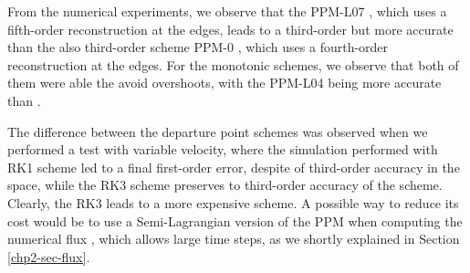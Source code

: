 From the numerical experiments, we observe that the PPM-L07 \citep{putman:2007},
which uses a fifth-order reconstruction at the edges, leads to a third-order but more
accurate than the also third-order scheme PPM-0 \citep{colella:1984}, 
which uses a fourth-order reconstruction at the edges. 
For the monotonic schemes, we observe that both of them were able the avoid
overshoots, with the PPM-L04 \citep{lin:2004} being more accurate than \citep{colella:1984}.

The difference between the  departure point schemes was observed 
when we performed a test with variable velocity,
where the simulation performed with RK1 scheme led to a final first-order error, despite
of third-order accuracy in the space, while the RK3 scheme preserves to 
third-order accuracy of the scheme. Clearly, the RK3 leads to a more expensive scheme.
A possible way to reduce its cost would be to use a Semi-Lagrangian version of the PPM
when computing the numerical flux \citep{chen:2017}, which allows large time steps,
as we shortly explained in Section \ref{chp2-sec-flux}.


